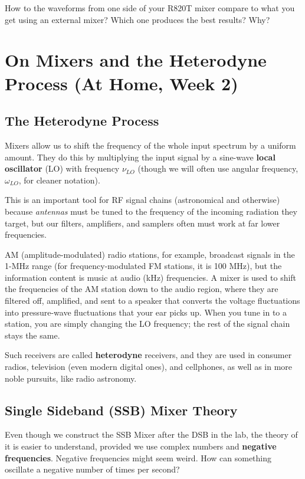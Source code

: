 \documentclass[11pt,preprint]{aastex}
\begin{document}
How to the waveforms from one side of your R820T mixer compare to
what you get using an external mixer? Which one produces the best
results? Why?


\section {On Mixers and the Heterodyne
  Process (At Home, Week 2)} \label{hetereo}

%
\subsection{The Heterodyne Process}
%
\noindent
Mixers allow us to shift the frequency of the
whole input spectrum by a uniform amount.  They do this by multiplying
the input signal by a sine-wave {\bf local oscillator} (LO) with frequency
$\nu_{LO}$ (though we will often use
angular frequency, $\omega_{LO}$, for cleaner notation).

This is an important tool for RF signal chains (astronomical and otherwise)
because {\it antennas} must be tuned to the frequency of the incoming radiation they
target, but our filters, amplifiers, and samplers often must work at far lower
frequencies.

AM (amplitude-modulated) radio stations, for example, broadcast signals in the 1-MHz
range (for frequency-modulated FM stations, it is 100 MHz), but the information content
is music at audio (kHz) frequencies.
A mixer is used to shift the frequencies of
the AM station down to the audio region, where they are filtered off, amplified, and
sent to a speaker that converts the voltage fluctuations into pressure-wave fluctuations
that your ear picks up.  When you tune in to a station, you are simply changing
the LO frequency; the rest of the signal chain stays the same.

Such receivers are called {\bf heterodyne} receivers, and they are used 
in consumer radios, television (even modern digital ones), and cellphones, as well
as in more noble pursuits, like radio astronomy.
%
\subsection{Single Sideband (SSB) Mixer Theory}

\noindent
Even though we construct the SSB Mixer after the DSB in the lab, the theory of it
is easier to understand, provided we use
complex numbers and {\bf negative frequencies}.
Negative frequencies might seem weird. How can something oscillate
a negative number of times per second?
\end{document}
